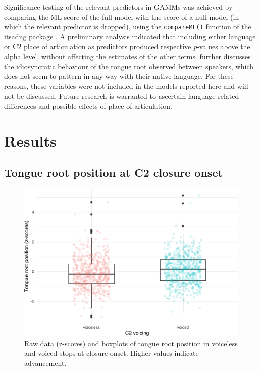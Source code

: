 \documentclass[preprint]{JASAnew}
\begin{document}
Significance testing of the relevant predictors in GAMMs was achieved by
comparing the ML score of the full model with the score of a null model
(in which the relevant predictor is dropped), using the
\texttt{compareML()} function of the itsadug package
\citep{van-rij2017}. A preliminary analysis indicated that including
either language or C2 place of articulation as predictors produced
respective \emph{p}-values above the alpha level, without affecting the
estimates of the other terms.  further discusses the
idiosyncratic behaviour of the tongue root observed between speakers,
which does not seem to pattern in any way with their native language.
For these reasons, these variables were not included in the models
reported here and will not be discussed. Future research is warranted to
ascertain language-related differences and possible effects of place of
articulation.

\hypertarget{results}{%
\section{Results}\label{results}}

\label{s:results}

\hypertarget{tongue-root-position-at-c2-closure-onset}{%
\subsection{Tongue root position at C2 closure
onset}\label{tongue-root-position-at-c2-closure-onset}}

\label{s:tra-lm}

\begin{figure}
\includegraphics[width=\linewidth]{./Figure3} \caption{Raw data (z-scores) and boxplots of tongue root position in voiceless and voiced stops at closure onset. Higher values indicate advancement.}\label{f:Figure3}
\end{figure}
\end{document}
